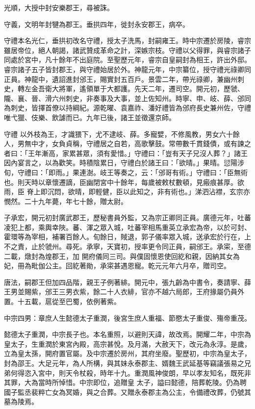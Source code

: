\begin{pinyinscope}
 光順，大授中封安樂郡王，尋被誅。



 守義，文明年封犍為郡王。垂拱四年，徙封永安郡王，病卒。



 守禮本名光仁，垂拱初改名守禮，授太子洗馬，封嗣雍王。時中宗遷於房陵，睿宗雖居帝位，絕人朝謁，諸武贊成革命之計，深嫉宗枝。守禮以父得罪，與睿宗諸子同處於宮中，凡十餘年不出庭院。至聖歷元年，睿宗自皇嗣封為相王，許出外邸。
 睿宗諸子五子皆封郡王，與守禮始居於外。神龍元年，中宗纂位，授守禮光祿卿同正員。神龍中，遺詔進封邠王，賜實封五百戶。景雲二年，帶光祿卿，兼幽州刺史，轉左金吾衛大將軍，遙領單于大都護。先天二年，遷司空。開元初，歷虢、隴、襄、晉、滑六州刺史，非奏事及大事，並上佐知州。時寧、申、岐、薛、邠同為刺史，皆擇首僚以持綱紀。源乾曜、袁嘉祚、潘好禮皆為邠府長史兼州佐，守禮唯弋獵、伎樂、飲謔而已。九年已後，諸王並徵還京師。



 守禮
 以外枝為王，才識猥下，尤不逮岐、薛。多寵嬖，不修風教，男女六十餘人，男無中才，女負貞稱，守禮居之自若，高歌擊鼓。常帶數千貫錢債，或有諫之者曰：「王年漸高，家累甚眾，須有愛惜。」守禮曰：「豈有天子兄沒人葬？」諸王因內宴言之，以為歡笑。時積陰累日，守禮白於諸王曰：「欲晴。」果晴。愆陽涉旬，守禮曰：「即雨。」果連澍。岐王等奏之，云：「邠哥有術。」守禮曰：「臣無術也。則天時以章懷遷謫，臣幽閉宮中十餘年，每歲被敕杖數頓，見瘢痕甚厚。欲雨，臣
 脊上即沉悶，欲晴，即輕健，臣以此知之，非有術也。」涕泗沾襟，玄宗亦憫然。二十九年薨，年七十餘，贈太尉。



 子承宏，開元初封廣武郡王，歷秘書員外監，又為宗正卿同正員。廣德元年，吐蕃凌犯上都，乘輿幸陜。蕃、渾之眾入城，吐蕃宰相馬重英立承宏為帝，以於可封、霍環等為宰相，補署百餘人。旬餘日，賊退，郭子儀率眾入城，送承宏於行在，上不之責，止於虢州。尋死。承寧，天寶初，授率更令同正員，嗣邠王。承寀，至德二載，燉封為煌郡王，加
 開府儀同三司。與僕固懷恩使回紇和親，因納其女為妃，冊為毗伽公主。回紇著勛，承寀甚遇恩寵。乾元元年六月卒，贈司空。



 唐法，嗣郡王但加四品階，親王子例著緋。開元中，張九齡為中書令，奏請寧、薛王男並賜紫，邠王三男衣紫，餘二十人衣緋，官亦不越六局郎，王府掾屬仍員外置。十五載，扈從至巴蜀，依例著紫。



 中宗四男：章庶人生懿德太子重潤，後宮生庶人重福、節愍太子重俊、殤帝重茂。



 懿德太子重潤，中宗長子也。本名重照，以避則天諱，故改焉。開耀二年，中宗為皇太子，生重潤於東宮內殿，高宗甚悅。及月滿，大赦天下，改元為永淳。是歲，立為皇太孫，開府置官屬。及中宗遷於房州，其府坐廢。聖歷初，中宗為皇太子，封為邵王。大足元年，為人所構，與其妹永泰郡主、婿魏王武延基等竊議張易之兄弟何得恣入宮中，則天令杖殺，時年十九。重潤風神俊朗，早以孝友知名，既死非其罪，大為當時所悼惜。中宗即位，追贈皇
 太子，謚曰懿德，陪葬乾陵。仍為聘國子監丞裴粹亡女為冥婚，與之合葬。又贈永泰郡主為公主，令備禮改葬，仍號其墓為陵焉。




\end{pinyinscope}

